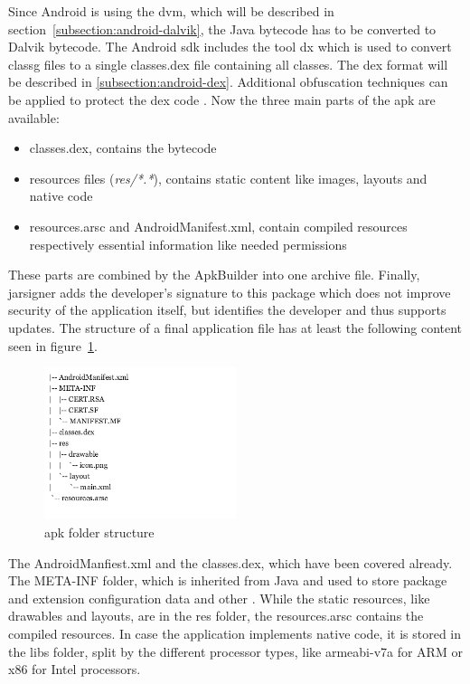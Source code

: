 \newline
Since Android is using the \gls{dvm}, which will be described in section~\ref{subsection:android-dalvik}, the Java bytecode has to be converted to Dalvik bytecode.
The Android \gls{sdk} includes the tool dx which is used to convert \gls{classg} files to a single classes.dex file containing all classes.
The \gls{dex} format will be described in \ref{subsection:android-dex}.
Additional obfuscation techniques can be applied to protect the \gls{dex} code \cite{dexProtector}.
\newline
Now the three main parts of the \gls{apk} are available:
\begin{itemize}
\item classes.dex, contains the bytecode
\item resources files (\textit{res/*.*}), contains static content like images, layouts and native code
\item resources.arsc and AndroidManifest.xml, contain compiled resources respectively essential information like needed permissions
\end{itemize}
These parts are combined by the ApkBuilder into one archive file.
\newline
Finally, jarsigner adds the developer’s signature to this package which does not improve security of the application itself, but identifies the developer and thus supports updates.
\newline
\newline
The structure of a final application file has at least the following content seen in figure~\ref{fig:apkfolder}.
\begin{figure}[h]
    \centering
    \includegraphics[width=0.5\textwidth]{data/apkfolder.png}
    \caption{\gls{apk} folder structure}
    \label{fig:apkfolder}
\end{figure}
The AndroidManfiest.xml and the classes.dex, which have been covered already.
The META-INF folder, which is inherited from Java and used to store package and extension configuration data and other \cite{metaJava}.
While the static resources, like drawables and layouts, are in the res folder, the resources.arsc contains the compiled resources.
In case the application implements native code, it is stored in the libs folder, split by the different processor types, like armeabi-v7a for ARM or x86 for Intel processors. \cite{kovachevaMaster} \cite{ehringerDalvik}
